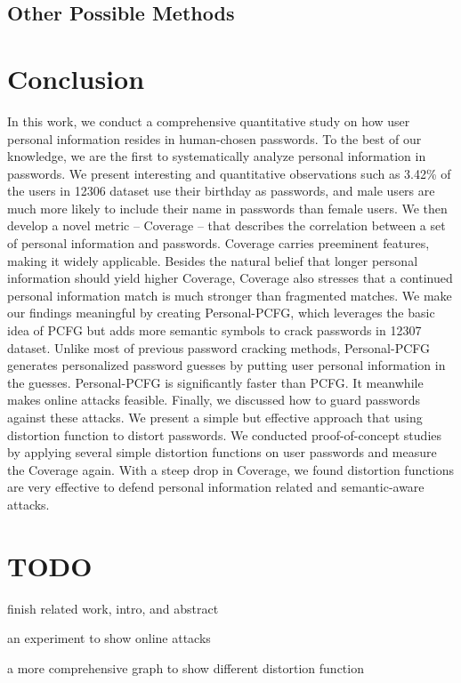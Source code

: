 \documentclass{sig-alternate}
\begin{document}
\subsection{Other Possible Methods}

\section{Conclusion}
In this work, we conduct a comprehensive quantitative study on how user personal information resides in human-chosen passwords. To the best of our knowledge, we are the first to systematically analyze personal information in passwords. We present interesting and quantitative observations such as 3.42\% of the users in 12306 dataset use their birthday as passwords, and male users are much more likely to include their name in passwords than female users. We then develop a novel metric -- Coverage -- that describes the correlation between a set of personal information and passwords. Coverage carries preeminent features, making it widely applicable. Besides the natural belief that longer personal information should yield higher Coverage, Coverage also stresses that a continued personal information match is much stronger than fragmented matches. We make our findings meaningful by creating Personal-PCFG, which leverages the basic idea of PCFG but adds more semantic symbols to crack passwords in 12307 dataset. Unlike most of previous password cracking methods, Personal-PCFG generates personalized password guesses by putting user personal information in the guesses. Personal-PCFG is significantly faster than PCFG. It meanwhile makes online attacks feasible. Finally, we discussed how to guard passwords against these attacks. We present a simple but effective approach that using distortion function to distort passwords. We conducted proof-of-concept studies by applying several simple distortion functions on user passwords and measure the Coverage again. With a steep drop in Coverage, we found distortion functions are very effective to defend personal information related and semantic-aware attacks.

\section{TODO}
finish related work, intro, and abstract

an experiment to show online attacks

a more comprehensive graph to show different distortion function
\end{document}
